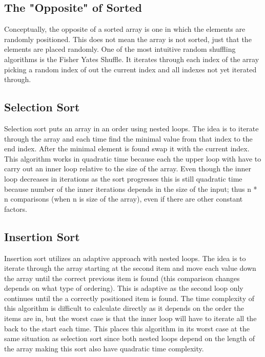\documentclass[letterpaper, 10pt]{article}
\begin{document}
\subsection{The "Opposite" of Sorted}
Conceptually, the opposite of a sorted array is one in which the elements are
randomly positioned. This does not mean the array is not sorted, just that the elements
are placed randomly. One of the most intuitive random shuffling algorithms is the Fisher Yates Shuffle.
It iterates through each index of the array picking a random index of out the current index and all indexes
not yet iterated through.

\subsection{Selection Sort}
Selection sort puts an array in an order using nested loops. The idea is to
iterate through the array and each time find the minimal value from that index to the end index.
After the minimal element is found swap it with the current index. This algorithm works in quadratic time
because each the upper loop with have to carry out an inner loop relative to the size of the array.
Even though the inner loop decreases in iterations as the sort progresses this is still quadratic time because
number of the inner iterations depends in the size of the input; thus n * n comparisons (when n is size of the array),
even if there are other constant factors. 

\subsection{Insertion Sort}
Insertion sort utilizes an adaptive approach with nested loops. The idea is to
iterate through the array starting at the second item and move each value 
down the array until the correct previous item is found (this comparison changes depends on what type of ordering).
This is adaptive as the second loop only continues until the a correctly positioned item is found.
The time complexity of this algorithm is difficult to calculate directly as it depends on the order the items
are in, but the worst case is that the inner loop will have to iterate all the back to the start each time.
This places this algorithm in its worst case at the same situation as selection sort since both nested loops depend on the length
of the array making this sort also have quadratic time complexity.

\end{document}
